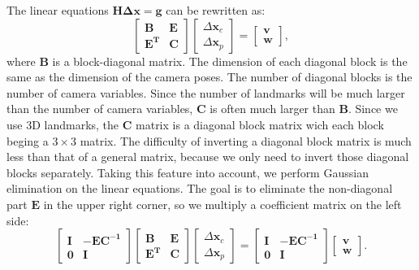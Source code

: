 The linear equations $\mathbf{H\Delta x} = \mathbf{g}$ can be rewritten as: 
\begin{equation}
	\label{eq:linearequations}
	\left[ \begin{matrix}
		\mathbf{B}   &   \mathbf{E} \\
		\mathbf{E^T} &   \mathbf{C}
	\end{matrix}\right] 
	\left[ \begin{array}{l}
		\Delta \mathbf{x}_c \\
		\Delta \mathbf{x}_p 
	\end{array} \right] = 
	\left[ \begin{array}{l}
		\mathbf{v} \\
		\mathbf{w} 
	\end{array} \right],
\end{equation}
where $\mathbf{B}$ is a block-diagonal matrix. The dimension of each diagonal block is the same as the dimension of the camera poses. The number of diagonal blocks is the number of camera variables. Since the number of landmarks will be much larger than the number of camera variables, $\mathbf{C}$ is often much larger than $\mathbf{B}$. Since we use 3D landmarks, the $\mathbf{C}$ matrix is a diagonal block matrix wich each block beging a $3 \times 3$ matrix. The difficulty of inverting a diagonal block matrix is much less than that of a general matrix, because we only need to invert those diagonal blocks separately. Taking this feature into account, we perform Gaussian elimination on the linear equations. The goal is to eliminate the non-diagonal part $\mathbf{E}$ in the upper right corner, so we multiply a coefficient matrix on the left side: 
\begin{equation}\label{eq:guasselimination}
	\left[ \begin{matrix}
		\mathbf{I}   &    -\mathbf{EC^{-1}} \\
		\mathbf{0}	 &	  \mathbf{I}
	\end{matrix}\right]
	\left[ \begin{matrix}
		\mathbf{B}   &   \mathbf{E} \\
		\mathbf{E^T} &   \mathbf{C}
	\end{matrix}\right] 
	\left[ \begin{array}{l}
		\Delta \mathbf{x}_c \\
		\Delta \mathbf{x}_p 
	\end{array} \right] = 
	\left[ \begin{matrix}
		\mathbf{I}   &    -\mathbf{EC^{-1}}  \\
		\mathbf{0}	 &	  \mathbf{I}
	\end{matrix}
	\right]
	\left[ \begin{array}{l}
		\mathbf{v} \\
		\mathbf{w} 
	\end{array} \right]  .
\end{equation}

